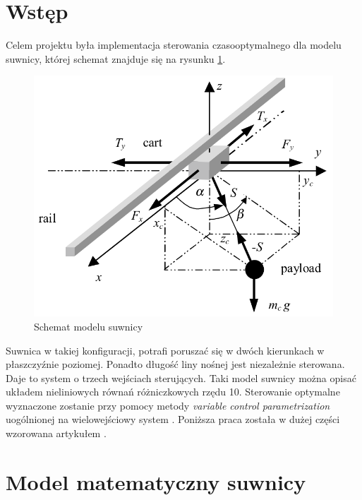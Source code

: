 \documentclass[12pt]{article}
\begin{document}
 
 

\section{Wstęp}

Celem projektu była implementacja sterowania czasooptymalnego dla modelu
suwnicy, której schemat znajduje się na rysunku \ref{sch:model}.

\begin{figure}[!htb]
  \begin{center}
    \includegraphics[width=14cm]
    {../res/img/sch-model.png}
  \end{center}
  \caption{Schemat modelu suwnicy}
  \label{sch:model}
\end{figure}

Suwnica w takiej konfiguracji, potrafi poruszać się w dwóch kierunkach w
płaszczyźnie poziomej. Ponadto długość liny nośnej jest niezależnie sterowana.
Daje to system o trzech wejściach sterujących. Taki model suwnicy można opisać
układem nieliniowych równań różniczkowych rzędu 10. Sterowanie optymalne
wyznaczone zostanie przy pomocy metody \textit{variable control
parametrization} uogólnionej na wielowejściowy system \cite{agh:vcpftop}.
Poniższa praca została w dużej części wzorowana artykułem \cite{agh:crane}.

\newpage

\section{Model matematyczny suwnicy}



\newpage

\printbibliography
\end{document}
